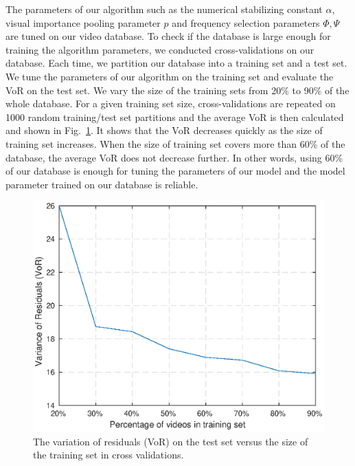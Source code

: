 \documentclass{sig-alternate}
\begin{document}
\begin{table}
\centering
\caption{\label{tab:cross_validation}Performance of the proposed metric on the testing sets when 60\% of the video database is used for training.}
\end{table}
The parameters of our algorithm such as the numerical stabilizing constant $\alpha$, visual importance pooling parameter $p$ and frequency selection parameters $\Phi, \Psi$ are tuned on our video database. To check if the database is large enough for training the algorithm parameters, we conducted cross-validations on our database. Each time, we partition our database into a training set and a test set. We tune the parameters of our algorithm on the training set and evaluate the VoR on the test set. We vary the size of the training sets from 20\% to 90\% of the whole database. For a given training set size, cross-validations are repeated on 1000 random training/test set partitions and the average VoR is then calculated and shown in Fig.~\ref{fig:cross_validation}. It shows that the VoR decreases quickly as the size of training set increases. When the size of training set covers more than 60\% of the database, the average VoR does not decrease further. In other words, using 60\% of our database is enough for tuning the parameters of our model and the model parameter trained on our database is reliable. 
\begin{figure}
\includegraphics[width=\columnwidth]{./img/cross_validation.eps}
\caption{\label{fig:cross_validation} The variation of residuals (VoR) on the test set versus the size of the training set in cross validations.}
\end{figure}
\end{document}

